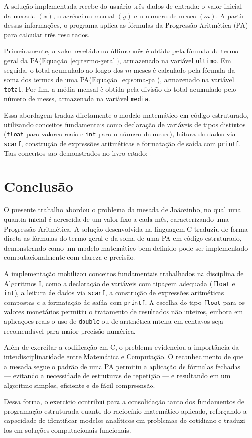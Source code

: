 \documentclass[12pt, a4paper]{article}
\begin{document}
A solução implementada recebe do usuário três dados de entrada: o valor inicial 
da mesada $(x)$, o acréscimo mensal $(y)$ e o número de meses $(m)$. A partir 
dessas informações, o programa aplica as fórmulas da Progressão Aritmética (PA) 
para calcular três resultados.

Primeiramente, o valor recebido no último mês é obtido pela fórmula do termo 
geral da PA(Equação~\eqref{eq:termo-geral}), armazenado na variável \texttt{ultimo}. 
Em seguida, o total acumulado ao longo dos $m$ meses é calculado pela fórmula da 
soma dos termos de uma PA(Equação~\eqref{eq:soma-pa}), armazenado na variável 
\texttt{total}. Por fim, a média mensal é obtida pela divisão do total acumulado 
pelo número de meses, armazenada na variável \texttt{media}.


Essa abordagem traduz diretamente o modelo matemático em código estruturado, 
utilizando conceitos fundamentais como declaração de variáveis de tipos distintos 
(\texttt{float} para valores reais e \texttt{int} para o número de meses), leitura 
de dados via \texttt{scanf}, construção de expressões aritméticas e formatação 
de saída com \texttt{printf}. Tais conceitos são demonstrados no livro citado: 
\cite{medina2006}.

\section*{Conclusão}


O presente trabalho abordou o problema da mesada de Joãozinho, no qual uma quantia 
inicial é acrescida de um valor fixo a cada mês, caracterizando uma Progressão 
Aritmética. A solução desenvolvida na linguagem C traduziu de forma direta as 
fórmulas do termo geral e da soma de uma PA em código estruturado, demonstrando 
como um modelo matemático bem definido pode ser implementado computacionalmente 
com clareza e precisão.


A implementação mobilizou conceitos fundamentais trabalhados na disciplina de 
Algoritmos I, como a declaração de variáveis com tipagem adequada (\texttt{float} 
e \texttt{int}), a leitura de dados via \texttt{scanf}, a construção de expressões 
aritméticas compostas e a formatação de saída com \texttt{printf}. A escolha do 
tipo \texttt{float} para os valores monetários permitiu o tratamento de resultados 
não inteiros, embora em aplicações reais o uso de \texttt{double} ou de aritmética 
inteira em centavos seja recomendável para maior precisão numérica.


Além de exercitar a codificação em C, o problema evidenciou a importância da 
interdisciplinaridade entre Matemática e Computação. O reconhecimento de que 
a mesada segue o padrão de uma PA permitiu a aplicação de fórmulas fechadas — 
evitando a necessidade de estruturas de repetição — e resultando em um algoritmo 
simples, eficiente e de fácil compreensão.


Dessa forma, o exercício contribui para a consolidação tanto dos fundamentos de 
programação estruturada quanto do raciocínio matemático aplicado, reforçando a 
capacidade de identificar modelos analíticos em problemas do cotidiano e 
traduzi-los em soluções computacionais funcionais.


\end{document}
